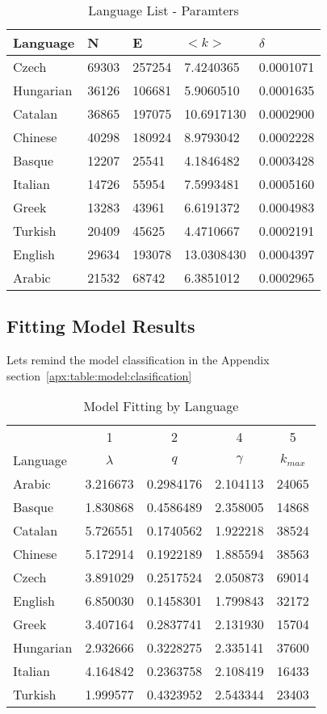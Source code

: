 \documentclass[12pt, a4paper]{article}
\begin{document}
\begin{table}[H]
    \centering
    \begin{tabular}{l l l l l}
    Language & N & E & $<k>$ & $\delta$ \\
     \hline
     Czech     & 69303 & 257254 & 7.4240365 & 0.0001071  \\
     Hungarian & 36126 & 106681 & 5.9060510 & 0.0001635  \\
     Catalan   & 36865 & 197075 & 10.6917130 & 0.0002900 \\ 
     Chinese   & 40298 & 180924 & 8.9793042 & 0.0002228  \\
     Basque    & 12207 & 25541 & 4.1846482 & 0.0003428  \\
     Italian   & 14726 & 55954 & 7.5993481 & 0.0005160  \\
     Greek     & 13283 & 43961 & 6.6191372 & 0.0004983  \\
     Turkish   & 20409 & 45625 & 4.4710667 & 0.0002191  \\
     English   & 29634 & 193078 & 13.0308430 & 0.0004397 \\ 
     Arabic    &   21532 & 68742 & 6.3851012 & 0.0002965 \\ 
    \end{tabular}
   \caption{Language List - Paramters}
   \label{table:1}
\end{table}

\subsection{Fitting Model Results}
Lets remind the model classification in the Appendix section~\ref{apx:table:model:clasification}

\begin{table}[H]
\centering
    \begin{tabular}{l c c c c}
             & 1 & 2 & 4 & 5\\
    Language & $\lambda$ & $q$ & $\gamma$ & $k_{max}$\\
     \hline
     Arabic    & 3.216673 & 0.2984176 & 2.104113 & 24065 \\
     Basque    & 1.830868 & 0.4586489 & 2.358005 & 14868 \\
     Catalan   & 5.726551 & 0.1740562 & 1.922218 & 38524 \\
     Chinese   & 5.172914 & 0.1922189 & 1.885594 & 38563 \\
     Czech     & 3.891029 & 0.2517524 & 2.050873 & 69014 \\
     English   & 6.850030 & 0.1458301 & 1.799843 & 32172 \\
     Greek     & 3.407164 & 0.2837741 & 2.131930 & 15704 \\
     Hungarian & 2.932666 & 0.3228275 & 2.335141 & 37600 \\
     Italian   & 4.164842 & 0.2363758 & 2.108419 & 16433 \\
     Turkish   & 1.999577 & 0.4323952 & 2.543344 & 23403 
    \end{tabular}
   \caption{Model Fitting by Language}
   \label{table:3}
\end{table}
\end{document}

